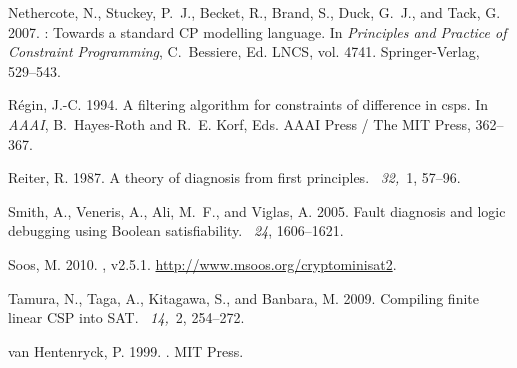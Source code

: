 \documentclass{tlp}
\begin{document}
\begin{thebibliography}{}
{\sc Nethercote, N.}, {\sc Stuckey, P.~J.}, {\sc Becket, R.}, {\sc Brand, S.},
  {\sc Duck, G.~J.}, {\sc and} {\sc Tack, G.} 2007.
: Towards a standard {CP} modelling language.
\newblock In {\em Principles and Practice of Constraint Programming},
  {C.~Bessiere}, Ed. LNCS, vol. 4741. Springer-Verlag, 529--543.

{\sc R{\'e}gin, J.-C.} 1994.
\newblock A filtering algorithm for constraints of difference in csps.
\newblock In {\em AAAI}, {B.~Hayes-Roth} {and} {R.~E. Korf}, Eds. AAAI Press /
  The MIT Press, 362--367.

{\sc Reiter, R.} 1987.
\newblock A theory of diagnosis from first principles.
~{\em 32,\/}~1, 57--96.

{\sc Smith, A.}, {\sc Veneris, A.}, {\sc Ali, M.~F.}, {\sc and} {\sc Viglas,
  A.} 2005.
\newblock Fault diagnosis and logic debugging using {B}oolean satisfiability.
~{\em 24}, 1606--1621.

{\sc Soos, M.} 2010.
, v2.5.1.
\newblock \url{http://www.msoos.org/cryptominisat2}.

{\sc Tamura, N.}, {\sc Taga, A.}, {\sc Kitagawa, S.}, {\sc and} {\sc Banbara,
  M.} 2009.
\newblock Compiling finite linear {CSP} into {SAT}.
~{\em 14,\/}~2, 254--272.

{\sc van Hentenryck, P.} 1999.
.
\newblock MIT Press.

\end{thebibliography}
\end{document}
